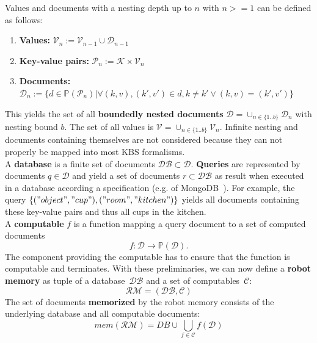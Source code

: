 \documentclass[a4paper,11pt]{article}
\begin{document}
Values and documents with a nesting depth up to $n$ with $n>=1$ can be
defined as follows:
\begin{enumerate}
\item  \textbf{Values:} $\mathcal{V}_n := \mathcal{V}_{n-1} \cup \mathcal{D}_{n-1}$
\item \textbf{Key-value pairs:} $\mathcal{P}_n:=\mathcal{K}\times\mathcal{V}_n$
\item \textbf{Documents:}
  $\mathcal{D}_n:=\{
  d\in\mathbb{P}(\mathcal{P}_n)|
  \forall (k,v),(k',v')\in d , k\neq k' \vee (k,v)=(k',v')
  \}$
\end{enumerate}
This yields the set of all \textbf{boundedly nested documents}
$\mathcal{D}=\cup_{n\in\{1..b\}}\mathcal{D}_n$ with nesting bound $b$.
The set of all values is $\mathcal{V}=\cup_{n\in\{1..b\}}\mathcal{V}_n$.
  Infinite nesting and
documents containing themselves are not considered because they can
not properly be mapped into most KBS formalisms.
\\
A \textbf{database} is a finite set of documents $\mathcal{DB} \subset \mathcal{D}$.
\textbf{Queries} are represented by documents $q\in\mathcal{D}$ and yield a set
of documents $r\subset\mathcal{DB}$ as result when executed in a database according a
specification (e.g. of MongoDB~\cite{mongodb}). For example, the query
$\{("object","cup"),("room","kitchen")\}$ yields all documents containing these
key-value pairs and thus all cups in the kitchen.
\\
A \textbf{computable} $f$ is a function mapping a query document to a
set of computed documents
$$f: \mathcal{D} \rightarrow \mathbb{P}(\mathcal{D})\text{.}$$
The component providing the computable has to ensure that the function is computable and terminates.
%
With these preliminaries, we can now define a \textbf{robot memory} as tuple
of a database~$\mathcal{DB}$ and a set of computables~$\mathcal{C}$:
$$\mathcal{RM}=(\mathcal{DB},\mathcal{C})$$
%
The set of documents \textbf{memorized} by the robot memory consists
of the underlying database and all computable documents:
$$mem(\mathcal{RM})=DB \cup \bigcup_{f\in\mathcal{C}}f(\mathcal{D})$$
\end{document}
